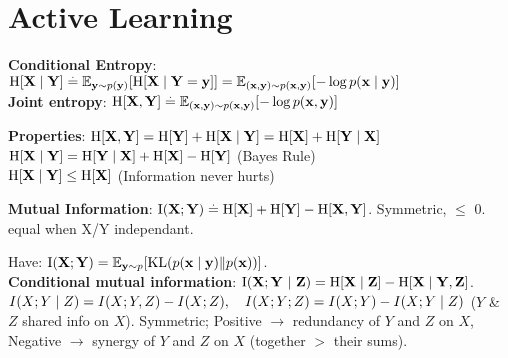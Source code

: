 \section{Active Learning}
\begin{framed}
    \textbf{Conditional Entropy}: $\H{\rX \mid \rY} \defeq \E[\vy \sim p(\vy)]{\H{\rX \mid \rY = \vy}} \\= \E[(\vx, \vy) \sim p(\vx, \vy)]{- \log p(\vx \mid \vy)}$ \\
    \textbf{Joint entropy}: $\H{\rX, \rY} \defeq \E[(\vx, \vy) \sim p(\vx, \vy)]{- \log p(\vx, \vy)}$ 
    \vspace{1mm}
\end{framed}
\begin{framed}
    \textbf{Properties}: $\H{\rX, \rY} = \H{\rY} + \H{\rX \mid \rY} = \H{\rX} + \H{\rY \mid \rX}$ \\
    $\H{\rX \mid \rY} = \H{\rY \mid \rX} + \H{\rX} - \H{\rY}$ (Bayes Rule) \\
    $\H{\rX \mid \rY} \leq \H{\rX}$ (Information never hurts)
\end{framed}
\begin{framed}
    \textbf{Mutual Information}: $\I{\rX}{\rY} \defeq \H{\rX} + \H{\rY} - \H{\rX, \rY}$. Symmetric, $\leq$ 0. equal when X/Y independant.
\end{framed}
Have: $\I{\rX}{\rY} = \E[\vy \sim p]{\KL{p(\vx \mid \vy)}{p(\vx)}}$. \\
\textbf{Conditional mutual information}: $\I{\rX}{\rY}[\rZ] = \H{\rX \mid \rZ} - \H{\rX \mid \rY, \rZ}$. \\
$I(X; Y \mid Z) = I(X; Y, Z) - I(X; Z), \\ \quad I(X; Y; Z) = I(X; Y) - I(X; Y \mid Z)$ ($Y$ & $Z$ shared info on $X$). Symmetric; Positive $\rightarrow$ redundancy of $Y$ and $Z$ on $X$, Negative $\rightarrow$ synergy of $Y$ and $Z$ on $X$ (together $\gt$ their sums).

